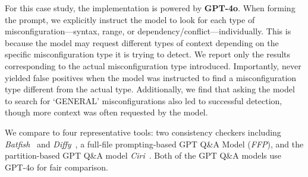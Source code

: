 For this case study, the \sysname{} implementation is powered by \textbf{GPT-4o}. When forming the prompt, we explicitly instruct the model to look for each type of misconfiguration—syntax, range, or dependency/conflict—individually. This is because the model may request different types of context depending on the specific misconfiguration type it is trying to detect. We report only the results corresponding to the actual misconfiguration type introduced. Importantly, \sysname{} never yielded false positives when the model was instructed to find a misconfiguration type different from the actual type. Additionally, we find that asking the model to search for `GENERAL' misconfigurations also led to successful detection, though more context was often requested by the model. 

We compare \sysname{} to four representative tools: two consistency checkers including \textit{Batfish}~\cite{fogel2015general} and \textit{Diffy}~\cite{kakarla2024diffy}, a full-file prompting-based GPT Q\&A Model (\textit{FFP}), and the partition-based GPT Q\&A model \textit{Ciri}~\cite{lian2023configuration}. Both of the GPT Q\&A models use GPT-4o for fair comparison.




